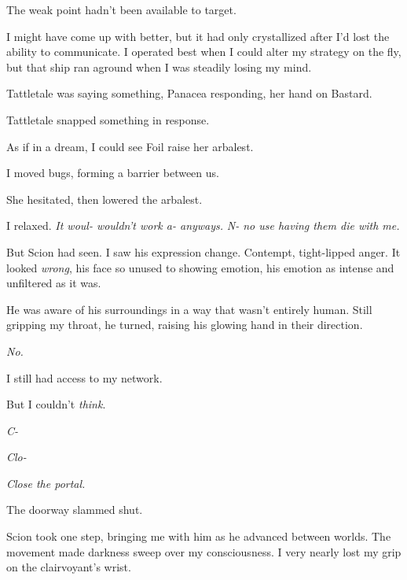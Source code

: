 The weak point hadn't been available to target.



I might have come up with better, but it had only crystallized after I'd lost the ability to communicate.  I operated best when I could alter my strategy on the fly, but that ship ran aground when I was steadily losing my mind.



Tattletale was saying something, Panacea responding, her hand on Bastard.



Tattletale snapped something in response.



As if in a dream, I could see Foil raise her arbalest.



I moved bugs, forming a barrier between us.



She hesitated, then lowered the arbalest.



I relaxed.  \emph{It woul- wouldn't work a- anyways.  }\emph{N- no use having them die with me.}



But Scion had seen.  I saw his expression change.  Contempt, tight-lipped anger.  It looked \emph{wrong}, his face so unused to showing emotion, his emotion as intense and unfiltered as it was.



He was aware of his surroundings in a way that wasn't entirely human.  Still gripping my throat, he turned, raising his glowing hand in their direction.



\emph{No.}



I still had access to my network.



But I couldn't \emph{think}.



\emph{C-}



\emph{Clo-}



\emph{Close the portal.}



The doorway slammed shut.



Scion took one step, bringing me with him as he advanced between worlds.  The movement made darkness sweep over my consciousness.  I very nearly lost my grip on the clairvoyant's wrist.



